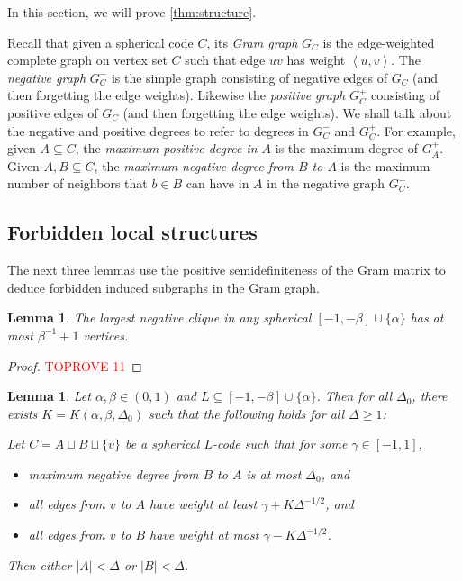 \documentclass[reqno, 11pt]{amsart}
\newtheorem{lemma}[theorem]{Lemma}
\theoremstyle{definition}
\theoremstyle{remark}
\newcommand{\ang}[1]{\left\langle #1 \right\rangle}
\begin{document}
In this section, we will prove \cref{thm:structure}. 

Recall that given a spherical code $C$, its \emph{Gram graph} $G_C$ is the edge-weighted complete graph on vertex set $C$ such that edge $uv$ has weight $\ang{u,v}$. The \emph{negative graph} $G_C^-$ is the simple graph consisting of negative edges of $G_C$ (and then forgetting the edge weights). Likewise the \emph{positive graph} $G_C^+$ consisting of positive edges of $G_C$ (and then forgetting the edge weights).
We shall talk about the negative and positive degrees to refer to degrees in $G_C^-$ and $G_C^+$. For example, given $A \subseteq C$, the \emph{maximum positive degree in $A$} is the maximum degree of $G_A^+$. Given $A,B \subseteq C$, the \emph{maximum negative degree from $B$ to $A$} is the maximum number of neighbors that $b \in B$ can have in $A$ in the negative graph $G_C^-$.

\subsection{Forbidden local structures}

The next three lemmas use the positive semidefiniteness of the Gram matrix to deduce forbidden induced subgraphs in the Gram graph.

\begin{lemma}\label{lem:negative-clique}
The largest negative clique in any spherical $[-1,-\beta]\cup\{\alpha\}$ has at most $\beta^{-1} + 1$ vertices.
\end{lemma}

\begin{proof}\textcolor{red}{TOPROVE 11}\end{proof}



\begin{lemma}\label{lem:very-strong-positive-clique}
Let $ \alpha, \beta \in(0,1)$ and $L \subseteq [-1,-\beta]\cup\{\alpha\}$. Then for all $\Delta_0$, there exists  $K=K(\alpha,\beta,\Delta_0)$ such that the following holds for all $\Delta \geq 1$: 

Let $C = A \sqcup B \sqcup \{v\}$ be a spherical $L$-code such that for some $\gamma \in [-1,1]$,
\begin{itemize}
    \item[(a)] maximum negative degree from $B$ to $A$ is at most $\Delta_0$, and
    \item[(b)] all edges from $v$ to $A$ have weight at least $\gamma + K\Delta^{-1/2}$, and
    \item[(c)] all edges from $v$ to $B$ have weight at most $\gamma - K\Delta^{-1/2}$.
\end{itemize}
Then either $|A| < \Delta$ or $|B| < \Delta$.
\end{lemma}
\end{document}

